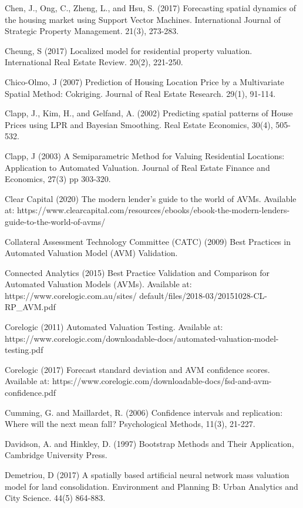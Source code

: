 \documentclass[colTwo]{anon}
\theoremstyle{definition}
\begin{document}
\begin{thebibliography}{50}
\harvarditem{}{}{}Chen, J., Ong, C., Zheng, L., and Hsu, S. (2017) Forecasting spatial dynamics of the housing market using Support Vector Machines. International Journal of Strategic Property Management. 21(3), 273-283.

\harvarditem{}{}{}Cheung, S (2017) Localized model for residential property valuation. International Real Estate Review. 20(2), 221-250.

\harvarditem{}{}{}Chico-Olmo, J (2007) Prediction of Housing Location Price by a Multivariate Spatial Method: Cokriging. Journal of Real Estate Research. 29(1), 91-114.

\harvarditem{}{}{}Clapp, J., Kim, H., and Gelfand, A. (2002) Predicting spatial patterns of House Prices using LPR and Bayesian Smoothing. Real Estate Economics, 30(4), 505-532.

\harvarditem{}{}{}Clapp, J (2003) A Semiparametric Method for Valuing Residential Locations: Application to Automated Valuation. Journal of Real Estate Finance and Economics, 27(3) pp 303-320.

\harvarditem{}{}{}Clear Capital (2020) The modern lender’s guide to the world of AVMs. Available at: https://www.clearcapital.com/resources/ebooks/ebook-the-modern-lenders-guide-to-the-world-of-avms/

\harvarditem{}{}{}Collateral Assessment Technology Committee (CATC) (2009) Best Practices in Automated Valuation Model (AVM) Validation.

\harvarditem{}{}{}Connected Analytics (2015) Best Practice Validation and Comparison for Automated Valuation Models (AVMs). Available at: https://www.corelogic.com.au/sites/ default/files/2018-03/20151028-CL-RP\_AVM.pdf

\harvarditem{}{}{}Corelogic (2011) Automated Valuation Testing. Available at: https://www.corelogic.com/downloadable-docs/automated-valuation-model-testing.pdf

\harvarditem{}{}{}Corelogic (2017) Forecast standard deviation and AVM confidence scores. Available at: https://www.corelogic.com/downloadable-docs/fsd-and-avm-confidence.pdf

\harvarditem{}{}{} Cumming, G. and Maillardet, R. (2006) Confidence intervals and replication: Where will the next mean fall? Psychological Methods, 11(3), 21-227.

\harvarditem{}{}{}Davidson, A. and Hinkley, D. (1997) Bootstrap Methods and Their Application, Cambridge University Press.

\harvarditem{}{}{}Demetriou, D (2017) A spatially based artificial neural network mass valuation model for land consolidation. Environment and Planning B: Urban Analytics and City Science. 44(5) 864-883.


\end{thebibliography}
\end{document}
